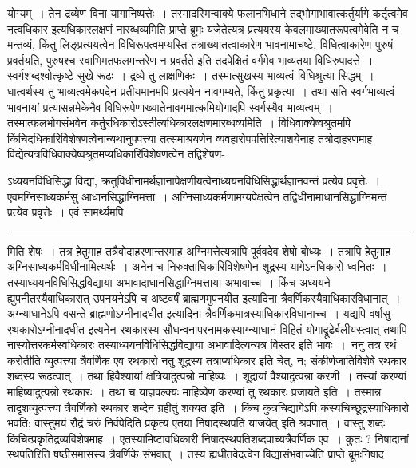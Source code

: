 \documentclass[11pt, openany]{book}
\newcommand\alfootnote[1]{%
  \begingroup
  \renewcommand\thefootnoteA{}\footnoteA{#1}%
  \addtocounter{footnoteA}{-1}%
  \endgroup
}
\begin{document}
योग्यम्~। तेन द्रव्येण विना यागानिष्पत्तेः~। तस्मादस्मिन्वाक्ये फलानभिधाने तद्भोगाभावात्कर्तुर्यागे कर्तृत्वमेव नत्वधिकार इत्यधिकारलक्षणं नारब्धव्यमिति प्राप्ते ब्रूमः {\qt यजेतेत्यत्र प्रत्ययस्य केवलमाख्यातरूपत्वमेवेति न च मन्तव्यं, किंतु लिङ्प्रत्ययत्वेन विधिरूपत्वमप्यस्ति तत्राख्यातत्वाकारेण भावनामाचष्टे, विधित्वाकारेण पुरुषं प्रवर्तयति, पुरुषश्च स्वाभिमतफलमन्तरेण न प्रवर्तते इति तदपेक्षितं वर्गमेव भाव्यतया विधिरुपादत्ते~}। स्वर्गशब्दश्वोत्कृष्टे सुखे रूढः~। द्रव्ये तु लाक्षणिकः~। तस्मात्सुखस्य भाव्यत्वं विधिश्रुत्या सिद्धम्~। धात्वर्थस्य तु भाव्यत्वमेकपदेन प्रतीयमानमपि प्रत्ययेन नावगम्यते, किंतु प्रकृत्या~। तथा सति स्वर्गभाव्यत्वं भावनायां प्रत्यासन्नमेकेनैव विधिरूपेणाख्यातेनावगमात्कमियोगादपि स्वर्गस्यैव भाव्यत्वम्~। तस्मात्फलभोगसंभवेन कर्तुरधिकारोऽस्तीत्यधिकारलक्षणमारब्धव्यमिति~। विधिवाक्येष्वश्रुतमपि किंचिदधिकारिविशेषणत्वेनान्यथानुपपत्त्या तत्समाश्रयणेन व्यवहारोपपत्तिरित्याशयेनाह तत्रोदाहरणमाह विद्येत्यत्रविधिवाक्येष्वश्रुतमप्यधिकारिविशेषणत्वेन तद्विशेषण-
\alfootnote{टिप्प०\textemdash\ $^{1}$आश्रीयते इति शेषः~।}
\newpage
\fancyhead[LO]{लक्षणम् ]}
{\bl\noindent ऽध्ययनविधिसिद्धा विद्या,
क्रतुविधीनामर्थज्ञाना\footnotemarkA[1]पेक्षणीयत्वेनाध्ययनविधि\textendash सिद्धार्थज्ञानवन्तं प्रत्येव प्रवृत्तेः~। एवमग्निसाध्यकर्मसु आधानसिद्धाग्निमत्ता~।
अग्निसाध्यकर्मणामग्यपेक्षत्वेन तद्विधीनामाधानसिद्धाग्निमन्तं प्रत्येव प्रवृत्तेः~। एवं सामर्थ्यमपि}\\
\hrule
\vspace{3mm}
\noindent
मिति शेषः~। तत्र हेतुमाह तत्रैवोदाहरणान्तरमाह अग्निमत्तेत्यत्रापि पूर्ववदेव शेषो बोध्यः~। तत्रापि हेतुमाह अग्निसाध्यकर्मविधीनामित्यर्थः~। अनेन च निरुक्ताधिकारिविशेषणेन शूद्रस्य यागेऽनधिकारो ध्वनितः~। तस्याध्ययनविधिसिद्धविद्याया अभावादाधानसिद्धाग्निमत्ताया अभावाच्च~। किंच अध्ययने ह्युपनीतस्यैवाधिकारात् उपनयनेऽपि च {\qt अष्टवर्षं ब्राह्मणमुपनयीत} इत्यादिना
त्रैवर्णिकस्यैवाधिकारविधानात्~। अग्न्याधानेऽपि {\qt वसन्ते ब्राह्मणोऽग्नीनादधीत} इत्यादिना त्रैवर्णिकमात्रस्याधिकारविधानाच्च~। यद्यपि {\qt वर्षासु रथकारोऽग्नीनादधीत} इत्यनेन रथकारस्य सौधन्वनापरनामकस्याग्न्याधानं विहितं योगाद्रूढेर्बलीयस्त्वात् तथापि नास्योत्तरकर्मस्वधिकारः तस्याध्ययनविधिसिद्धविद्याया अभावादित्यन्यत्र विस्तर इति भावः~।~{\br ननु} तत्र रथं करोतीति व्युत्पत्त्या त्रैवर्णिक एव रथकारो नतु शूद्रस्य तत्राप्यधिकार इति चेत्, {\br न}; संकीर्णजातिविशेषे {\qt रथकार} शब्दस्य रूढत्वात्~। तथा हि\textendash वैश्यायां क्षत्रियादुत्पन्नो माहिष्यः~। शूद्रायां वैश्यादुत्पन्ना करणी~। तस्यां करण्यां माहिष्यादुत्पन्नो रथकारः~। तथा च याज्ञवल्क्यः  {\qt माहिष्येण करण्यां तु रथकारः प्रजायते} इति~। तस्मान्न तादृशव्युत्पत्त्या त्रैवर्णिको {\qt रथकार} शब्देन ग्रहीतुं  शक्यत इति~। किंच कुत्रचिद्यागेऽपि कस्यचिच्छूद्रस्याधिकारो भवति; {\qt वास्तुमयं रौद्रं चरुं निर्वपे}दिति प्रकृत्य {\qt एतया निषादस्थपतिं याजयेत्} इति श्रवणात्~। {\qt वास्तु} शब्दः किंचित्प्रकृतिद्रव्यविशेषमाह~। एतस्यामिष्टावधिकारी निषादस्थपतिशब्दवाच्यत्रैवर्णिक एव~। कुतः ? निषादानां स्थपतिरिति षष्ठीसमासस्य त्रैवर्णिके संभवात्~। तस्य ह्यधीतवेदत्वेन विद्यासंभवाच्चेति प्राप्ते ब्रूमः{\qt निषाद}
\end{document}
